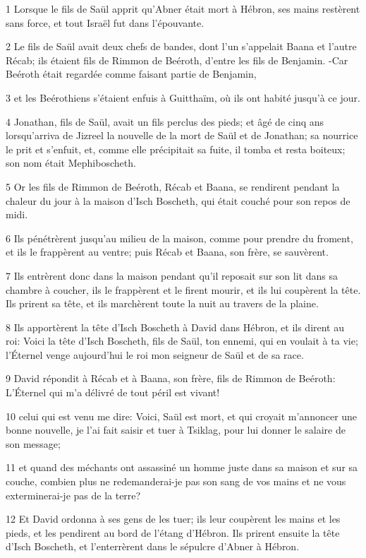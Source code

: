 \par 1 Lorsque le fils de Saül apprit qu'Abner était mort à Hébron, ses mains restèrent sans force, et tout Israël fut dans l'épouvante.
\par 2 Le fils de Saül avait deux chefs de bandes, dont l'un s'appelait Baana et l'autre Récab; ils étaient fils de Rimmon de Beéroth, d'entre les fils de Benjamin. -Car Beéroth était regardée comme faisant partie de Benjamin,
\par 3 et les Beérothiens s'étaient enfuis à Guitthaïm, où ils ont habité jusqu'à ce jour.
\par 4 Jonathan, fils de Saül, avait un fils perclus des pieds; et âgé de cinq ans lorsqu'arriva de Jizreel la nouvelle de la mort de Saül et de Jonathan; sa nourrice le prit et s'enfuit, et, comme elle précipitait sa fuite, il tomba et resta boiteux; son nom était Mephiboscheth.
\par 5 Or les fils de Rimmon de Beéroth, Récab et Baana, se rendirent pendant la chaleur du jour à la maison d'Isch Boscheth, qui était couché pour son repos de midi.
\par 6 Ils pénétrèrent jusqu'au milieu de la maison, comme pour prendre du froment, et ils le frappèrent au ventre; puis Récab et Baana, son frère, se sauvèrent.
\par 7 Ils entrèrent donc dans la maison pendant qu'il reposait sur son lit dans sa chambre à coucher, ils le frappèrent et le firent mourir, et ils lui coupèrent la tête. Ils prirent sa tête, et ils marchèrent toute la nuit au travers de la plaine.
\par 8 Ils apportèrent la tête d'Isch Boscheth à David dans Hébron, et ils dirent au roi: Voici la tête d'Isch Boscheth, fils de Saül, ton ennemi, qui en voulait à ta vie; l'Éternel venge aujourd'hui le roi mon seigneur de Saül et de sa race.
\par 9 David répondit à Récab et à Baana, son frère, fils de Rimmon de Beéroth: L'Éternel qui m'a délivré de tout péril est vivant!
\par 10 celui qui est venu me dire: Voici, Saül est mort, et qui croyait m'annoncer une bonne nouvelle, je l'ai fait saisir et tuer à Tsiklag, pour lui donner le salaire de son message;
\par 11 et quand des méchants ont assassiné un homme juste dans sa maison et sur sa couche, combien plus ne redemanderai-je pas son sang de vos mains et ne vous exterminerai-je pas de la terre?
\par 12 Et David ordonna à ses gens de les tuer; ils leur coupèrent les mains et les pieds, et les pendirent au bord de l'étang d'Hébron. Ils prirent ensuite la tête d'Isch Boscheth, et l'enterrèrent dans le sépulcre d'Abner à Hébron.

